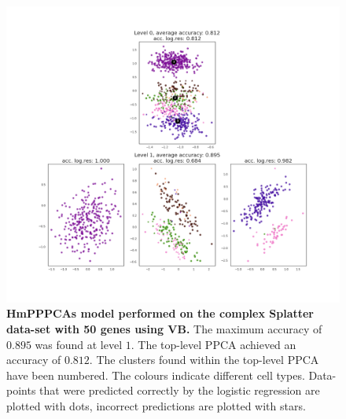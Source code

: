 \begin{figure}
    \centering
    \includegraphics[width=\linewidth]{figs/complex_50_vb.png}
    \caption[HmPPPCAs model performed on the complex Splatter data-set with 50 genes using VB]{\small \textbf{HmPPPCAs model performed on the complex Splatter data-set with 50 genes using VB.} \small The maximum accuracy of $0.895$ was found at level $1$. The top-level PPCA achieved an accuracy of $0.812$. The clusters found within the top-level PPCA have been numbered. The colours indicate different cell types. Data-points that were predicted correctly by the logistic regression are plotted with dots, incorrect predictions are plotted with stars.}
    \label{fig:complex_50_vb}
\end{figure}

